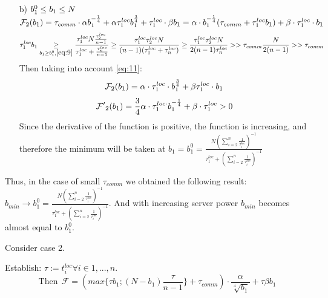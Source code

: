 \documentclass{article}
\begin{document}
\begin{itemize}
    \item[b)] $b_1^0\leq b_1\leq N\\$
    $\mathcal{F}_2(b_1) = \tau_{comm}\cdot 
    \alpha  b_1^{-\frac{1}{4}} + 
    \alpha\tau_1^{loc} b_1^{\frac{3}{4}}  + \tau_1^{loc}\cdot \beta b_1 =  \alpha\cdot b_1^{-\frac{1}{4}}(\tau_{comm} + \tau_1^{loc}b_1) + \beta\cdot\tau_1^{loc}\cdot b_1\\$
    \begin{eqnarray}
        \label{eq:11}
        \begin{split}
            \tau_1^{loc}b_1\underset{b_1\geq b_1^0, \ref{eq:9}}{\geq} \frac{\tau_1^{loc}N\frac{\tau_2^{loc}}{n - 1}}{\tau_1^{loc} + \frac{\tau_n^{loc}}{n - 1}}\geq \frac{\tau_1^{loc}\tau_2^{loc}N}{(n - 1)(\tau_1^{loc} + \tau_n^{loc})}\geq \frac{\tau_1^{loc}\tau_2^{loc}N}{2(n - 1)\tau_n^{loc}} >> \tau_{comm}\frac{N}{2(n - 1)} >> \tau_{comm}
        \end{split}
    \end{eqnarray}
    Then taking into account \ref{eq:11}:
    \begin{equation}
        \notag
        \mathcal F_2(b_1) = \alpha\cdot\tau_1^{loc}\cdot b_1^{\frac{3}{4}} + \beta \tau_1^{loc}\cdot b_1
    \end{equation}
    \begin{equation}
        \notag
        \mathcal{F'}_2(b_1) = \frac{3}{4}\alpha\cdot\tau_1^{loc\cdot} b_1^{-\frac{1}{4}} + \beta\cdot\tau_1^{loc} > 0
    \end{equation}
    Since the derivative of the function is positive, the function is increasing, and therefore the minimum will be taken at $b_1 = b_1^{0} = \frac{N (\sum\limits_{i = 2}^{n} \frac{1}{\tau_i^{loc}})^{-1}}{\tau_1^{loc} + (\sum\limits_{i = 2}^{n} \frac{1}{\tau_i^{loc}})^{-1}}$  
\end{itemize}

Thus, in the case of small $\tau_{comm}$ we obtained the following result:\\
$b_{min}\rightarrow b_1^{0} = \frac{N (\sum\limits_{i = 2}^{n} \frac{1}{\tau_i^{loc}})^{-1}}{\tau_1^{loc} + (\sum\limits_{i = 2}^{n} \frac{1}{\tau_i^{loc}})^{-1}}$. And with increasing server power $b_{min}$ becomes almost equal to $b_1^0$.

Consider case 2.

Establish: $\tau := t_i^{loc} \forall i \in {1,..., n} $. 
\begin{equation}
        \text{Then} ~ ~\mathcal{F} = (max\{\tau b_1; (N-b_1) \frac{\tau}{n-1}\} + \tau_{comm}) \cdot \frac{\alpha}{\sqrt[4]{b_1}}+\tau \beta b_1 
\end{equation}
\end{document}
